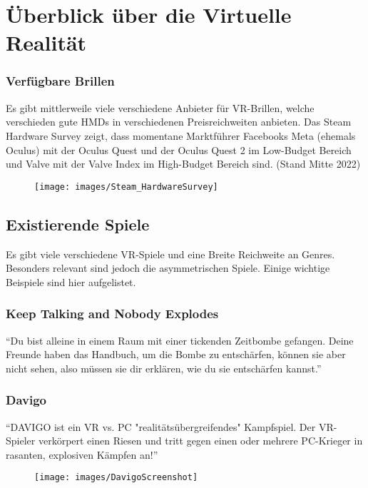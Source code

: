 \chapter{Überblick über die Virtuelle Realität}


\subsection{Verfügbare Brillen}
Es gibt mittlerweile viele verschiedene Anbieter für VR-Brillen, welche verschieden gute HMDs in verschiedenen Preisreichweiten anbieten.
Das Steam Hardware Survey zeigt, dass momentane Marktführer Facebooks Meta (ehemals Oculus) mit der Oculus Quest und der Oculus Quest 2 im Low-Budget Bereich und Valve mit der Valve Index im High-Budget Bereich sind. (Stand Mitte 2022)


\begin{figure}[H]
	\centering
	\texttt{[image: images/Steam\_HardwareSurvey]}
	\caption{\cite{_steam_hardware}}
\end{figure}

\section{Existierende Spiele}
Es gibt viele verschiedene VR-Spiele und eine Breite Reichweite an Genres. Besonders relevant sind jedoch die asymmetrischen Spiele. Einige wichtige Beispiele sind hier aufgelistet.

\subsection{Keep Talking and Nobody Explodes}
"`Du bist alleine in einem Raum mit einer tickenden Zeitbombe gefangen. Deine Freunde haben das Handbuch, um die Bombe zu entschärfen, können sie aber nicht sehen, also müssen sie dir erklären, wie du sie entschärfen kannst."'
\cite{_steam_keeptalking}

\subsection{Davigo}
"`DAVIGO ist ein VR vs. PC "realitätsübergreifendes" Kampfspiel. Der VR-Spieler verkörpert einen Riesen und tritt gegen einen oder mehrere PC-Krieger in rasanten, explosiven Kämpfen an!"'

\begin{figure}[H]
	\centering
	\texttt{[image: images/DavigoScreenshot]}
	\caption{\cite{_steam_davigo}}
\end{figure}

